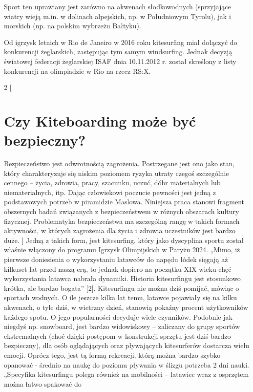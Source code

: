 \documentclass{article}
\begin{document}
Sport ten uprawiany jest zarówno na akwenach słodkowodnych (sprzyjające wiatry wieją m.in. w dolinach alpejskich, np. w Południowym Tyrolu), jak i morskich (np. na polskim wybrzeżu Bałtyku).

Od igrzysk letnich w Rio de Janeiro w 2016 roku kitesurfing miał dołączyć do konkurencji żeglarskich, zastępując tym samym windsurfing. Jednak decyzją światowej federacji żeglarskiej ISAF dnia 10.11.2012 r. został skreślony z listy konkurencji na olimpiadzie w Rio na rzecz RS:X. \cite{kitesurf_wiki}

\begin{multicols}{2}
[
\section{Czy Kiteboarding może być bezpieczny?}
Bezpieczeństwo jest odwrotnością zagrożenia. Postrzegane jest ono jako stan, który charakteryzuje się niskim
poziomem ryzyka utraty czegoś szczególnie cennego – życia, zdrowia, pracy, szacunku, uczuć, dóbr materialnych lub
niematerialnych, itp. Dając człowiekowi poczucie pewności jest jedną z podstawowych potrzeb w piramidzie Maslowa.
Niniejsza praca stanowi fragment obszernych badań związanych z bezpieczeństwem w różnych obszarach kultury fizycznej.
Problematyka bezpieczeństwa ma szczególną rangę w takich formach aktywności, w których zagrożenia dla życia i zdrowia
uczestników jest bardzo duże. 
]
Jedną z takich form, jest kitesurfing, który jako dyscyplina sportu został właśnie włączony do programu Igrzysk
Olimpijskich w Paryżu 2024. „Mimo, iż pierwsze doniesienia o wykorzystaniu latawców do napędu łódek sięgają aż kilkuset
lat przed naszą erą, to jednak dopiero na początku XIX wieku chęć wykorzystania latawca nabrała dynamiki. Historia
kitesurfingu jest stosunkowo krótka, ale bardzo bogata” [2].
Kitesurfingu nie można dziś pomijać, mówiąc o sportach wodnych. O ile jeszcze kilka lat temu, latawce pojawiały się
na kilku akwenach, o tyle dziś, w wietrzny dzień, stanowią pokaźny procent użytkowników każdego spotu.
O jego popularności decyduje wiele czynników. Podobnie jak niegdyś np. snowboard, jest bardzo widowiskowy –
zaliczany do grupy sportów ekstremalnych (choć dzięki postępom w konstrukcji sprzętu jest dziś bardzo bezpieczny), dla
osób oglądających oraz pływających kitesurferów dostarcza wielu emocji. Oprócz tego, jest tą formą rekreacji, którą można
bardzo szybko opanować - średnio na naukę do poziomu pływania w ślizgu potrzeba 2 dni nauki.
„Specyfika kitesurfingu polega również na mobilności – latawiec wraz z osprzętem można łatwo spakować do

\end{multicols}
\end{document}
